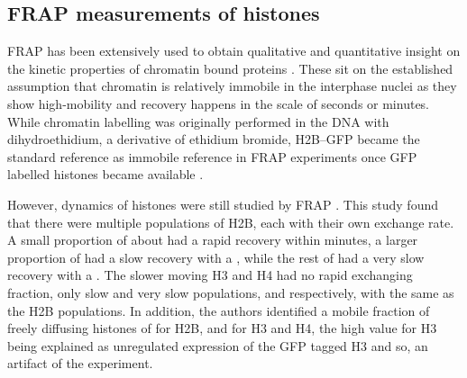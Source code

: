   \subsection{FRAP measurements of histones}

    FRAP has been extensively used to obtain qualitative and
    quantitative insight on the kinetic properties of chromatin bound
    proteins \citep{phair2000high, essers2005nuclear, agresti2005gr}.
    These sit on the established assumption that chromatin is
    relatively immobile in the interphase nuclei
    \citep{abney1997chromatin} as they show high-mobility and recovery
    happens in the scale of seconds or minutes.  While chromatin
    labelling was originally performed in the DNA with
    dihydroethidium, a derivative of ethidium bromide, H2B--GFP became
    the standard reference as immobile reference in FRAP experiments
    \citep{dey2000bromodomain} once GFP labelled histones became
    available \citep{KevinH2BGFP}.


    However, dynamics of histones were still studied by FRAP
    \citep{KimuraCook}.  This study found that there were multiple
    populations of H2B, each with their own exchange rate.  A small
    proportion of about  had a rapid recovery within minutes,
    a larger proportion of  had a slow recovery with a
    , while the rest of 
    had a very slow recovery with a \halflife[$>$\SI{510}{\minute}].  The
    slower moving H3 and H4 had no rapid exchanging fraction, only
    slow and very slow populations,  and 
    respectively, with the same \halflife[] as the H2B populations.
    In addition, the authors identified a mobile fraction of freely
    diffusing histones of  for H2B, and  for H3 and
    H4, the high value for H3 being explained as unregulated
    expression of the GFP tagged H3 and so, an artifact of the
    experiment.

